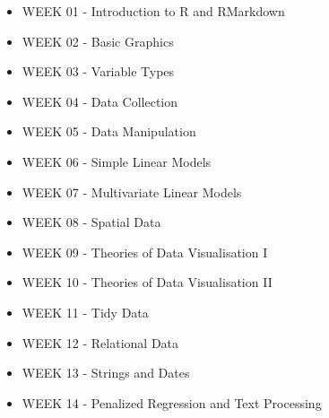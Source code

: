 \documentclass[12pt]{article}
\begin{document}
\begin{itemize}\setlength\itemsep{0em}
\item WEEK 01 - Introduction to R and RMarkdown
\item WEEK 02 - Basic Graphics
\item WEEK 03 - Variable Types
\item WEEK 04 - Data Collection
\item WEEK 05 - Data Manipulation
\item WEEK 06 - Simple Linear Models
\item WEEK 07 - Multivariate Linear Models
\item WEEK 08 - Spatial Data
\item WEEK 09 - Theories of Data Visualisation I
\item WEEK 10 - Theories of Data Visualisation II
\item WEEK 11 - Tidy Data
\item WEEK 12 - Relational Data
\item WEEK 13 - Strings and Dates
\item WEEK 14 - Penalized Regression and Text Processing
\end{itemize}
\end{document}
